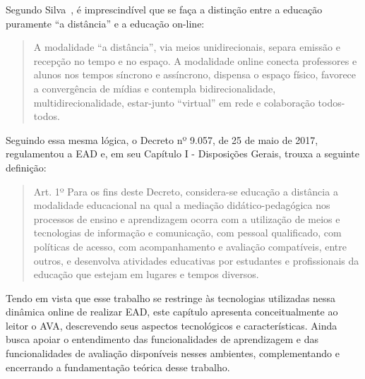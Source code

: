 \newcommand{\texCommand}[1]{\texttt{\textbackslash{#1}}}%

\newcommand{\exemplo}[1]{%
\vspace{\baselineskip}%
\noindent\fbox{\begin{minipage}{\textwidth}#1\end{minipage}}%
\\\vspace{\baselineskip}}%

\newcommand{\exemploVerbatim}[1]{%
\vspace{\baselineskip}%
\noindent\fbox{\begin{minipage}{\textwidth}%
#1\end{minipage}}%
\\\vspace{\baselineskip}}%


\label{chap:ava}
Segundo Silva~\cite{silva2003educacao}, é imprescindível que se faça a distinção entre a educação puramente ``a distância'' e a educação on-line: 

\begin{quote}
A modalidade “a distância”, via meios unidirecionais, separa emissão e recepção no tempo e no espaço. A modalidade online conecta professores e alunos nos tempos síncrono e assíncrono, dispensa o espaço físico, favorece a convergência de mídias e contempla bidirecionalidade, multidirecionalidade, estar-junto “virtual” em rede e colaboração todos-todos.~\cite{silva2003educacao}
\end{quote}

Seguindo essa mesma lógica, o Decreto nº 9.057, de 25 de maio de 2017, regulamentou a EAD e, em seu Capítulo I - Disposições Gerais, trouxa a seguinte definição:

\begin{quote}
Art. 1º  Para os fins deste Decreto, considera-se educação a distância a modalidade educacional na qual a mediação didático-pedagógica nos processos de ensino e aprendizagem ocorra com a utilização de meios e tecnologias de informação e comunicação, com pessoal qualificado, com políticas de acesso, com acompanhamento e avaliação compatíveis, entre outros, e desenvolva atividades educativas por estudantes e profissionais da educação que estejam em lugares e tempos diversos.~\cite{brasilDec}
\end{quote}

Tendo em vista que esse trabalho se restringe às tecnologias utilizadas nessa dinâmica online de realizar EAD, este capítulo apresenta conceitualmente ao leitor o  \acrfull{AVA}, descrevendo seus aspectos tecnológicos e características. Ainda busca apoiar o entendimento das funcionalidades de aprendizagem e das funcionalidades de avaliação disponíveis nesses ambientes, complementando e encerrando a fundamentação teórica desse trabalho. 
